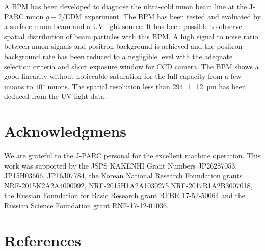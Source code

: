 \documentclass[preprint,3p,twocolumn]{elsarticle}
\begin{document}
A BPM has been developed to diagnose the ultra-cold muon beam line at the J-PARC muon $g-2$/EDM experiment. The BPM has been tested and evaluated by a surface muon beam and a UV light source.
It has been possible to observe spatial distribution of beam particles with this BPM.
A high signal to noise ratio between muon signals and positron background is achieved and the positron background rate has been reduced to a negligible level with the adequate selection criteria and short exposure window for CCD camera.
The BPM shows a good linearity without noticeable saturation for the full capacity from a few muons to $10^{4}$ muons. The spatial resolution less than \SI{294\pm12}{\micro\metre} has been deduced from the UV light data.


\section*{Acknowledgmens}

We are grateful to the J-PARC personal for the excellent machine operation.
This work was supported by 
the JSPS KAKENHI Grant Numbers JP26287053, JP15H03666, JP16J07784,
the Korean National Research Foundation grants NRF-2015K2A2A4000092, NRF-2015H1A2A1030275,NRF-2017R1A2B3007018,
the Russian Foundation for Basic Research grant RFBR 17-52-50064 and
the Russian Science Foundation grant RNF-17-12-01036. 

\section*{References}


\end{document}
